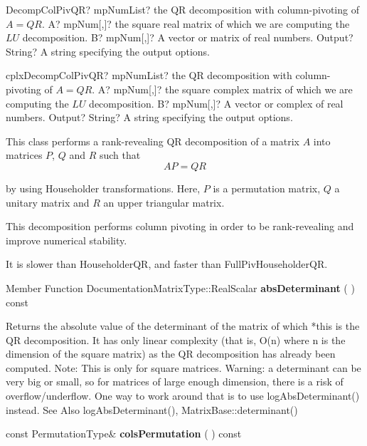 \begin{mpFunctionsExtract}
	\mpFunctionThree
	{DecompColPivQR? mpNumList? the QR decomposition with column-pivoting of $A = QR$.}
	{A? mpNum[,]? the square real matrix of which we are computing the $LU$ decomposition.}
	{B? mpNum[,]? A vector or matrix of real numbers.}
	{Output? String? A string specifying the output options.}
\end{mpFunctionsExtract}

\vspace{0.6cm}
\begin{mpFunctionsExtract}
	\mpFunctionThree
	{cplxDecompColPivQR? mpNumList? the QR decomposition with column-pivoting of $A = QR$.}
	{A? mpNum[,]? the square complex matrix of which we are computing the $LU$ decomposition.}
	{B? mpNum[,]? A vector or complex of real numbers.}
	{Output? String? A string specifying the output options.}
\end{mpFunctionsExtract}


\vspace{0.3cm}

This class performs a rank-revealing QR decomposition of a matrix $A$ into matrices $P$, $Q$ and $R$ such that 
\begin{equation}
AP=QR
\end{equation} 

by using Householder transformations. Here, $P$ is a permutation matrix, $Q$ a unitary matrix and $R$ an upper triangular matrix.

This decomposition performs column pivoting in order to be rank-revealing and improve numerical stability. 

It is slower than \textsf{HouseholderQR}, and faster than \textsf{FullPivHouseholderQR}.


Member Function DocumentationMatrixType::RealScalar \textbf{absDeterminant}  ( )  const 

Returns the absolute value of the determinant of the matrix of which *this is the QR decomposition. It has only linear complexity (that is, O(n) where n is the dimension of the square matrix) as the QR decomposition has already been computed.
Note: This is only for square matrices. 
Warning: a determinant can be very big or small, so for matrices of large enough dimension, there is a risk of overflow/underflow. One way to work around that is to use logAbsDeterminant() instead.
See Also logAbsDeterminant(), MatrixBase::determinant() 


\vspace{0.3cm}
const PermutationType\& \textbf{colsPermutation}  ( )  const 

